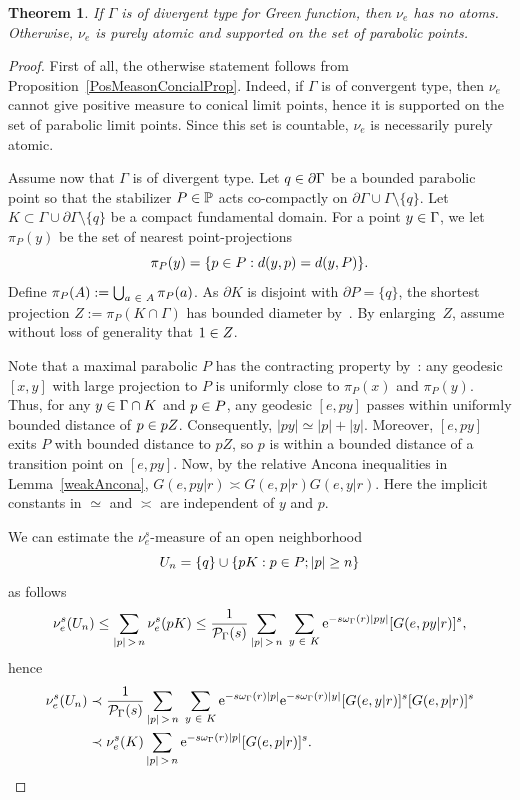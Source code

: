 \documentclass[10pt]{amsart}
\newtheorem{theo}{Theorem}[section]
\theoremstyle{definition}\newtheorem{defi}[theo]{Definition}\newtheorem{rema}[theo]{Remark}\newtheorem{exam}[theo]{Example}\newtheorem{exem}[theo]{Example}\newtheorem{nota}[theo]{Notation}
\newcommand{\pG}{\partial{\Gamma}}
\newcommand{\bbP}{\mathbb{P}}
\newcommand{\rme}{\mathrm{e}}
\newcommand{\clP}{\mathcal{P}}
\let\oldin\in
\renewcommand{\in}{\mathchoice{\oldin}{\oldin}{\,\oldin\,}{\,\oldin\,}}
\let\oldge\ge
\renewcommand{\ge}{\mathchoice{\oldge}{\oldge}{\,\oldge\,}{\,\oldge\,}}
\let\oldle\le
\renewcommand{\le}{\mathchoice{\oldle}{\oldle}{\,\oldle\,}{\,\oldle\,}}
\begin{document}
\begin{theo}\label{divergencetypeandatoms}
If $\Gamma$ is of divergent type for Green function, then $\nu_e$ has no atoms. Otherwise, $\nu_e$ is purely atomic and supported on the set of parabolic points.
\end{theo}
\begin{proof}
First of all, the otherwise statement follows from Proposition~\ref{PosMeasonConcialProp}. Indeed, if $\Gamma$ is of convergent type, then $\nu_e$ cannot give positive measure to conical limit points, hence it is supported on the set of parabolic limit points. Since this set is countable, $\nu_e$ is necessarily purely atomic.

Assume now that $\Gamma$ is of divergent type. Let $q\in \pG$ be a bounded parabolic point so that the stabilizer $P\in \bbP$ acts co-compactly on $\pG\cup \Gamma \setminus \{q\}$. Let $K\subset \Gamma\cup\pG\setminus \{q\}$ be a compact fundamental domain.
For a point $y\in \Gamma$, we let $\pi_P(y)$ be the set of nearest point-projections
\[
\pi_P(y)=\{p\in P: d(y,p)=d(y,P)\}.
\]
Define $\pi_P(A):=\bigcup_{a\in A} \pi_P(a)$. As $\partial K$ is disjoint with $\partial P=\{q\}$, the shortest projection $Z:=\pi_P(K\cap \Gamma)$ has bounded diameter by~\cite[Proposition~3.3]{GP16}. By enlarging~$Z$, assume without loss of generality that $1\in Z$.

Note that a maximal parabolic $P$ has the contracting property by~\cite[Proposition~8.5]{GP16}: any geodesic $[x,y]$ with large projection to $P$ is uniformly close to $\pi_P(x)$ and $\pi_P(y)$. Thus, for any $y\in \Gamma\cap K$ and $p\in P$, any geodesic $[e,py]$ passes within uniformly bounded distance of $p\in pZ$. Consequently, $|p y| \simeq |p| + |y|$. Moreover, $[e,py]$ exits $P$ with bounded distance to $pZ$, so $p$ is within a bounded distance of a transition point on $[e,py]$. Now, by the relative Ancona inequalities in Lemma~\ref{weakAncona}, $G(e, p y|r) \asymp G(e, p|r) G(e, y|r)$. Here the implicit constants in $\simeq$ and $\asymp$ are independent of $y$ and $p$.



We can estimate the $\nu_e^s$-measure of an open neighborhood
\[
U_n= \{q\}\cup \{pK: p\in P; |p|\ge n\}
\]
as follows
\[
\nu_e^s(U_n) \le \sum_{|p|\,>\,n} \nu_e^s(pK) \le {\frac{1}{\clP_{\Gamma}(s)}} \sum_{|p|\,>\,n}\; \sum_{y\in K} \rme^{-s\omega_\Gamma(r)|p y|} [G(e, p y|r)]^s,
\]
hence
\begin{align*}
\nu_e^s(U_n) &\prec {\frac{1}{\clP_{\Gamma}(s)}} \sum_{|p|\,>\,n}\;\sum_{y\in K} \rme^{-s\omega_\Gamma(r)|p|} \rme^{-s\omega_\Gamma(r)|y|} [G(e,y|r)]^s [G(e,p|r)]^s\\
&\prec \nu_e^s(K) \sum_{|p|\,>\,n} \rme^{-s\omega_\Gamma(r) |p|} [G(e,p|r)]^s.
\end{align*}



\end{proof}
\end{document}
